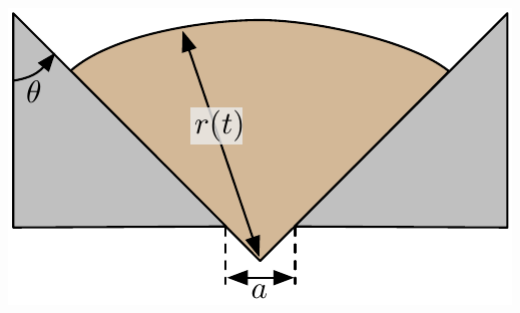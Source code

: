 \begin{enumerate}
\begin{enumerate}
\begin{minipage}[t]{0.33\textwidth}
\begin{flushright}
            \includegraphics[width=1.0\textwidth]{stadium2.pdf}    
            \end{flushright}
        \end{minipage}
    \end{enumerate}
\end{enumerate}
